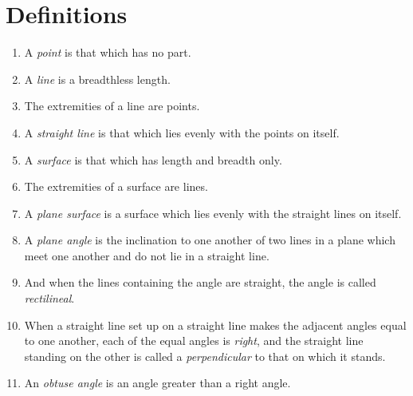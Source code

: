 \documentclass[12pt, twoside]{memoir}
\begin{document}
\chapter*{Definitions}
\renewcommand{\currentpropheader}{Definitions}
\begin{enumerate}
	\setlength{\itemsep}{0pt}
    \setlength{\parsep}{0pt}
    \setlength{\topsep}{4pt}
    \item A \emph{point} is that which has no part.\label{Def:I.I}
    \item A \emph{line} is a breadthless length.\label{Def:I.II}
    \item The extremities of a line are points.\label{Def:I.III}
    \item A \emph{straight line} is that which lies evenly with the points on itself.\label{Def:I.IV}
    \item A \emph{surface} is that which has length and breadth only.\label{Def:I.V}
    \item The extremities of a surface are lines.\label{Def:I.VI}
    \item A \emph{plane surface} is a surface which lies evenly with the straight lines on itself.\label{Def:I.VII}
    \item A \emph{plane angle} is the inclination to one another of two lines in a plane which meet one another and do not lie in a straight line.\label{Def:I.VIII}
    \item And when the lines containing the angle are straight, the angle is called \emph{rectilineal}.\label{Def:I.IX} 
        
        \iftoggle{defpics}{~\hfill\drawCurrentPicture\hfill~}{}
    \item When a straight line set up on a straight line makes the adjacent angles equal to one another, each of the equal angles is \emph{right}, and the straight line standing on the other is called a \emph{perpendicular} to that on which it stands.\label{Def:I.X}
        
        \iftoggle{defpics}{~\hfill\drawCurrentPicture\hfill~}{}
    \item An \emph{obtuse angle} is an angle greater than a right angle.\label{Def:I.XI}
        

\end{enumerate}
\end{document}
